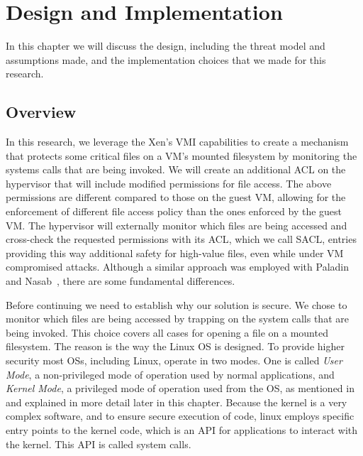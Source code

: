 \acresetall
\chapter{Design and Implementation}\label{ch:chapter3}

In this chapter we will discuss the design, including the threat model and assumptions made, and the implementation choices that we made for this research.	

\section{Overview}\label{sec:overview}

\par In this research, we leverage the Xen’s \ac{VMI} capabilities to create a mechanism that protects some critical files on a \ac{VM}'s mounted filesystem by monitoring the systems calls that are being invoked. We will create an additional \ac{ACL} on the hypervisor that will include modified permissions for file access. The above permissions are different compared to those on the guest \ac{VM}, allowing for the enforcement of different file access policy than the ones enforced by the guest \ac{VM}. The hypervisor will externally monitor which files are being accessed and cross-check the requested permissions with its \ac{ACL}, which we call \ac{SACL}, entries providing this way additional safety for high-value files, even while under \ac{VM} compromised attacks. Although a similar approach was employed with Paladin~\cite{baliga2008automated} and Nasab~\cite{nasab2012security}, there are some fundamental differences. 

\par Before continuing we need to establish why our solution is secure. We chose to monitor which files are being accessed by trapping on the system calls that are being invoked. This choice covers all cases for opening a file on a mounted filesystem. The reason is the way the Linux \ac{OS} is designed. To provide higher security most \acp{OS}, including Linux, operate in two modes. One is called \emph{User Mode}, a non-privileged mode of operation used by normal applications, and \emph{Kernel Mode}, a privileged mode of operation used from the \ac{OS}, as mentioned in ~\cite{linuxkernel} and explained in more detail later in this chapter. Because the kernel is a very complex software, and to ensure secure execution of code, linux employs specific entry points to the kernel code, which is an \ac{API} for applications to interact with the kernel. This \ac{API} is called system calls. 

